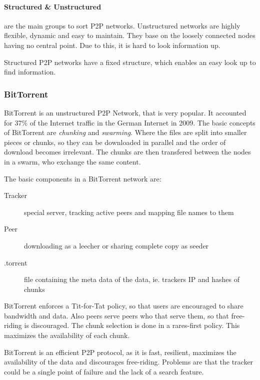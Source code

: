 \paragraph{Structured \& Unstructured} %
\label{par:structured_unstructured}
are the main groups to sort P2P networks.
Unstructured networks are highly flexible,
dynamic and easy to maintain.
They base on the loosely connected nodes having no central point.
Due to this, it is hard to look information up.

Structured P2P networks have a fixed structure,
which enables an easy look up to find information.

\subsubsection{BitTorrent} %
\label{ssub:bittorrent}
BitTorrent is an unstructured P2P Network, that is very popular.
It accounted for 37\% of the Internet traffic in the German Internet in 2009.
The basic concepts of BitTorrent are \emph{chunking} and \emph{swarming}.
Where the files are split into smaller pieces or chunks,
so they can be downloaded in parallel and the order of download becomes irrelevant.
The chunks are then transfered between the nodes in a swarm,
who exchange the same content.

The basic components in a BitTorrent network are:
\begin{description}
	\item[Tracker] special server, tracking active peers and mapping file names to them
	\item[Peer] downloading as a leecher or sharing complete copy as seeder
	\item[.torrent] file containing the meta data of the data, ie. trackers IP and hashes of chunks
\end{description}

BitTorrent enforces a Tit-for-Tat policy,
so that users are encouraged to share bandwidth and data.
Also peers serve peers who that serve them,
so that free-riding is discouraged.
The chunk selection is done in a rares-first policy.
This maximizes the availability of each chunk.

BitTorrent is an efficient P2P protocol,
as it is fast, resilient, maximizes the availability of the data
and discourages free-riding.
Problems are that the tracker could be a single point of failure
and the lack of a search feature.


